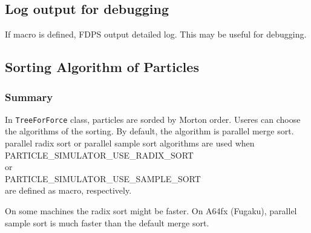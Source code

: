 \subsection{Log output for debugging}
\label{subsec:macro_debug}
If macro  is defined, FDPS output detailed log. This may be useful for debugging.

\subsection{Sorting Algorithm of Particles}
\label{sec:compile_sort_method}
\subsubsection{Summary}


In {\tt TreeForForce} class, particles are sorded by Morton
order. Useres can choose the algorithms of the sorting. By default,
the algorithm is parallel merge sort. parallel radix sort  or
parallel sample sort algorithms are  used
when\\
PARTICLE\_SIMULATOR\_USE\_RADIX\_SORT\\
or\\
PARTICLE\_SIMULATOR\_USE\_SAMPLE\_SORT\\
are defined as macro, respectively.




On some machines the radix sort might be faster. On A64fx (Fugaku),
parallel sample sort is much faster than the default merge sort.


